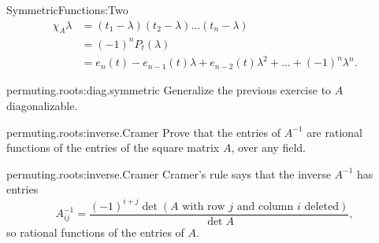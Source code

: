 \begin{answer}{SymmetricFunctions:Two}
\begin{align*}
\chi_A{\lambda}
&=
\left(t_1-\lambda\right)\left(t_2-\lambda\right)
\dots \left(t_n-\lambda\right)\\
&=(-1)^n P_{t}\left(\lambda\right)\\
&=
e_n(t) - e_{n-1}(t) \lambda + e_{n-2}(t) \lambda^2 + \dots + (-1)^n \lambda^n.
\end{align*}
\end{answer}
\begin{problem}{permuting.roots:diag.symmetric}
Generalize the previous exercise to \(A\) diagonalizable.
\end{problem}
\begin{problem}{permuting.roots:inverse.Cramer}
Prove that the entries of \(A^{-1}\) are rational functions of the entries of the square matrix \(A\), over any field.
\end{problem}
\begin{answer}{permuting.roots:inverse.Cramer}
Cramer's rule says that the inverse \(A^{-1}\) has entries
\[
A^{-1}_{ij} = \frac{(-1)^{i+j}\det (A \text{ with row \(j\) and column \(i\) deleted})}{\det A},
\]
so rational functions of the entries of \(A\).
\end{answer}

